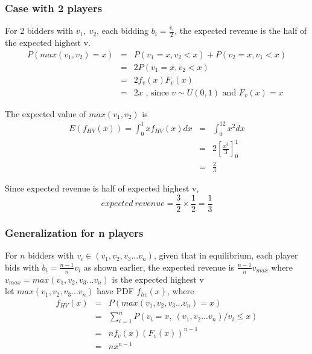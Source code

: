 \documentclass[10pt, a4paper]{article}
\begin{document}
\subsubsection{Case with 2 players}

For 2 bidders with $v_1, \ v_2$, each bidding $b_i = \frac{v_i}{2}$, the expected revenue is the half of the expected highest v. \\

\begin{eqnarray}
   P(max(v_1, v_2) = x) & = & P(v_1 = x, v_2 < x) + P(v_2 = x, v_1 < x) \nonumber \\
   & = & 2P(v_1 = x, v_2 < x)  \nonumber \\
   & = & 2 f_v(x) F_v(x) \nonumber \\
   & = & 2x  \nonumber \text{ , since $v \sim U(0, 1)$ and $F_v(x) = x$}
\end{eqnarray}

The expected value of $max(v_1, v_2)$ is
\begin{eqnarray}
   E(f_{HV}(x)) = \int_0^1 x f_{HV}(x) dx & =  &\int_0^12x^2 dx \nonumber \\
   & = & 2 \left[\frac{x^3}{3}\right] ^1_0 \nonumber \\
   & = & \frac{2}{3} \nonumber 
\end{eqnarray}

Since expected revenue is half of expected highest v, 
\begin{equation}
   expected\ revenue = \frac{3}{2} \times \frac{1}{2} = \frac{1}{3} \nonumber
\end{equation}

\subsubsection{Generalization for n players}
For $n$ bidders with $v_i \in \left( v_1, v_2, v_3 ... v_n \right) $, given that in equilibrium, each player bids with $b_i = \frac{n-1}{n} v_i$ as shown earlier, the expected revenue is $\frac{n-1}{n}v_{max}$ where $v_{max} = max\left( v_1, v_2, v_3 ... v_n \right) $ is the expected highest v \\

let $max\left( v_1, v_2, v_3 ... v_n \right)$ have PDF $f_{hv}(x)$, where
\begin{eqnarray}
   f_{HV}(x) & = & P(max\left( v_1, v_2, v_3 ... v_n \right) = x) \nonumber \\
             & = & \sum_{i = 1}^{n} P(v_i = x,\  \left(v_1, v_2 ... v_n\right) / v_i \le x) \nonumber \\
             & = & nf_v(x)(F_v(x))^{n-1} \nonumber \\
             & = & nx^{n-1} \nonumber 
\end{eqnarray}
\end{document}
